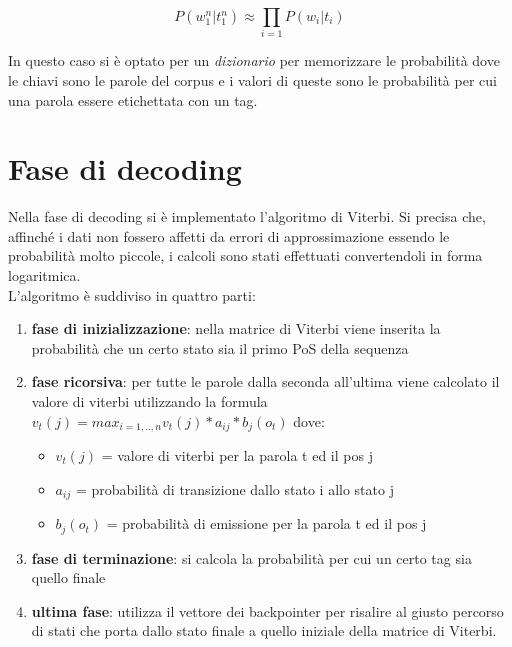 \documentclass[12pt]{article}
\begin{document}
\[ P(w_{1}^n|t_1^n) \approx \prod_{i=1} P(w_i|t_i)\]

In questo caso si è optato per un \textit{dizionario} per memorizzare le probabilità dove le chiavi sono le parole del corpus e i valori di queste sono le probabilità per cui una parola essere etichettata con un tag.
\section{Fase di decoding}
Nella fase di decoding si è implementato l’algoritmo di Viterbi. Si precisa che, affinché i dati non fossero affetti da errori di approssimazione essendo le probabilità molto piccole, i calcoli sono stati effettuati convertendoli in forma logaritmica.
\\
L’algoritmo è suddiviso in quattro parti:
\begin{enumerate}
    \item \textbf{fase di inizializzazione}: nella matrice di Viterbi viene inserita la probabilità che un certo stato sia il primo PoS della sequenza
    \item \textbf{fase ricorsiva}: per tutte le parole dalla seconda all’ultima viene calcolato il valore di viterbi utilizzando la formula $v_{t}(j) = max_{i=1,..,n}v_{t}(j)*a_{ij}*b_{j}(o_{t})$  dove:
    \begin{itemize}
        \item $v_{t}(j)$ = valore di viterbi per la parola t ed il pos j
        \item $a_{ij}$ = probabilità di transizione dallo stato i allo stato j
        \item $b_{j}(o_{t})$ = probabilità di emissione per la parola t ed il pos j
    \end{itemize}
    \item \textbf{fase di terminazione}: si calcola la probabilità per cui un certo tag sia quello finale
    \item \textbf{ultima fase}: utilizza il vettore dei backpointer per risalire al giusto percorso di stati che porta dallo stato finale a quello iniziale della matrice di Viterbi.
\end{enumerate} 
\end{document}
